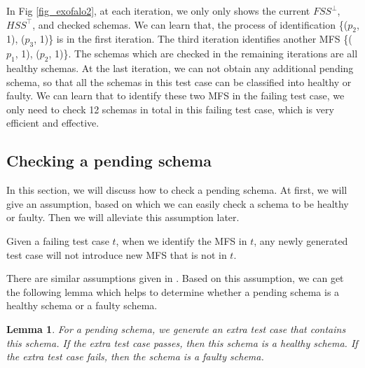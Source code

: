\documentclass{sig-alternate-05-2015}
\begin{document}
{In Fig \ref{fig_exofalo2}, at each iteration, we only only shows the current $FSS^{\bot}$, $HSS^{\top}$, and checked schemas. We can learn that, the process of identification \{($p_{2}$, 1), ($p_{3}$, 1)\} is in the first iteration.   The third iteration identifies another MFS \{($p_{1}$, 1), ($p_{2}$, 1)\}. The schemas which are checked in the remaining iterations are all healthy schemas. At the last iteration, we can not obtain any additional pending schema, so that all the schemas in this test case can be classified into healthy or faulty.  We can learn that to identify these two MFS in the failing test case, we only need to check 12 schemas in total in this failing test case, which is very efficient and effective.



\subsection{Checking a pending schema}
In this section, we will discuss how to check a pending schema. At first, we will give an assumption, based on which we can easily check a schema to be healthy or faulty. Then we will alleviate this assumption later.

\begin{assumption}
Given a failing test case $t$, when we identify the MFS in $t$, any newly generated test case will not introduce new MFS that is not in $t$.
\end{assumption}

There are similar assumptions given in \cite{zhang2011characterizing,martinez2008algorithms,martinez2009locating}. Based on this assumption, we can get the following lemma which helps to determine whether a pending schema is a healthy schema or a faulty schema.
\newtheorem{lemma}{Lemma}
\begin{lemma}
For a pending schema, we generate an extra test case that contains this schema. If the extra test case passes, then this schema is a healthy schema. If the extra test case fails, then the schema is a faulty schema.
\end{lemma}
%

}
\end{document}

